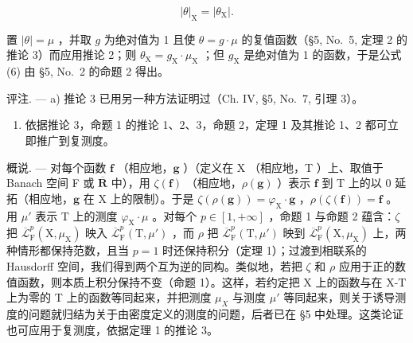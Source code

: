 \[
| \theta | _ {\mathrm{X}} = | \theta_ {\mathrm{X}} |.\tag{6}
\]

置 \(|\theta| = \mu\) ，并取 \(g\) 为绝对值为 1 且使 \(\theta = g \cdot \mu\) 的复值函数（§5, No.~5, 定理 2 的推论 3）而应用推论 2；则 \(\theta_{\mathrm{X}} = g_{\mathrm{X}} \cdot \mu_{\mathrm{X}}\) ；但 \(g_{\mathrm{X}}\) 是绝对值为 1 的函数，于是公式 (6) 由 §5, No.~2 的命题 2 得出。

评注. --- a) 推论 3 已用另一种方法证明过（Ch. IV, §5, No.~7, 引理 3）。

\begin{enumerate}
\def\labelenumi{\alph{enumi})}
\setcounter{enumi}{1}
\tightlist
\item
  依据推论 3，命题 1 的推论 1、2、3，命题 2，定理 1 及其推论 1、2 都可立即推广到复测度。
\end{enumerate}

概说. --- 对每个函数 \(\mathbf{f}\) （相应地，\(\mathbf{g}\) ）（定义在 X （相应地，T ）上、取值于 Banach 空间 F 或 \(\overline{\mathbf{R}}\) 中），用 \(\zeta(\mathbf{f})\) （相应地，\(\rho(\mathbf{g})\) ）表示 \(\mathbf{f}\) 到 T 上的以 0 延拓（相应地，\(\mathbf{g}\) 在 X 上的限制）。于是 \(\zeta(\rho(\mathbf{g})) = \varphi_{\mathrm{X}} \cdot \mathbf{g}\) ，\(\rho(\zeta(\mathbf{f})) = \mathbf{f}\) 。用 \(\mu'\) 表示 T 上的测度 \(\varphi_{\mathrm{X}} \cdot \mu\) 。对每个 \(p \in [1, +\infty]\) ，命题 1 与命题 2 蕴含：\(\zeta\) 把 \(\overline{\mathcal{L}}_{\mathrm{F}}^{p}(\mathrm{X}, \mu_{\mathrm{X}})\) 映入 \(\overline{\mathcal{L}}_{\mathrm{F}}^{p}(\mathrm{T}, \mu')\) ，而 \(\rho\) 把 \(\overline{\mathcal{L}}_{\mathrm{F}}^{p}(\mathrm{T}, \mu')\) 映到 \(\overline{\mathcal{L}}_{\mathrm{F}}^{p}(\mathrm{X}, \mu_{\mathrm{X}})\) 上，两种情形都保持范数，且当 \(p = 1\) 时还保持积分（定理 1）；过渡到相联系的 Hausdorff 空间，我们得到两个互为逆的同构。类似地，若把 \(\zeta\) 和 \(\rho\) 应用于正的数值函数，则本质上积分保持不变（命题 1）。这样，若约定把 X 上的函数与在 X-T 上为零的 T 上的函数等同起来，并把测度 \(\mu_{X}\) 与测度 \(\mu'\) 等同起来，则关于诱导测度的问题就归结为关于由密度定义的测度的问题，后者已在 §5 中处理。这类论证也可应用于复测度，依据定理 1 的推论 3。

